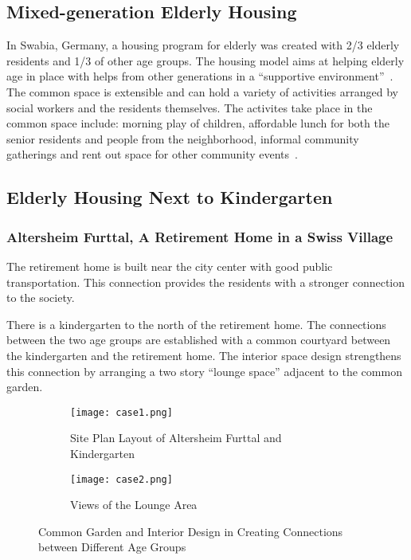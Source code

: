 \subsection{Mixed-generation Elderly Housing}
In Swabia, Germany, a housing program for elderly was created with 2/3
elderly residents and 1/3 of other age groups. The housing model aims
at helping elderly age in place with helps from other generations in a
``supportive environment''~\cite{Fromm2015}. The common space is
extensible and can hold a variety of activities arranged by social
workers and the residents themselves. The activites take place in the
common space include: morning play of children, affordable lunch for
both the senior residents and people from the neighborhood, informal
community gatherings and rent out space for other community
events~\cite{Fromm2015}.

\subsection{Elderly Housing Next to Kindergarten}
\subsubsection{Altersheim Furttal, A Retirement Home in a Swiss Village}
The retirement home is built near the city center with good public
transportation. This connection provides the residents with a stronger
connection to the society.

There is a kindergarten to the north of the retirement home. The
connections between the two age groups are established with a common
courtyard between the kindergarten and the retirement home. The
interior space design strengthens this connection by arranging a two
story ``lounge space'' adjacent to the common garden.

\begin{figure}
\centering
\begin{subfigure}{0.7\textwidth}
  \centering
  \texttt{[image: case1.png]}
  \caption{Site Plan Layout of Altersheim Furttal and Kindergarten}
  \label{fig:case1}
\end{subfigure}
\begin{subfigure}{0.7\textwidth}
  \centering
  \texttt{[image: case2.png]}
  \caption{Views of the Lounge Area}
  \label{fig:case2}
\end{subfigure}
\caption{Common Garden and Interior Design in Creating Connections
  between Different Age Groups}
\label{fig:case2}
\end{figure}
